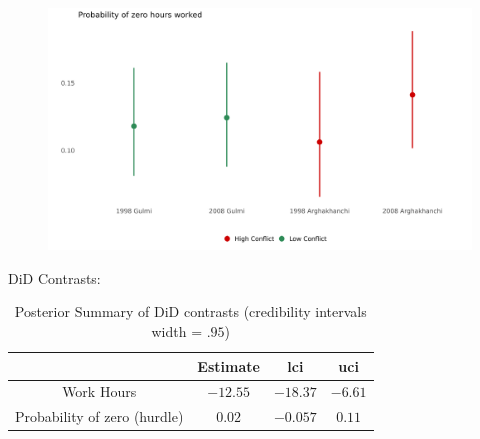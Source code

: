 \documentclass[12pt,a4paper]{article}
\providecommand{\tabularnewline}{\\}
\begin{document}
\begin{figure}[H]
	\centering
	\includegraphics[width=1\textwidth]{../Analysis files/coefplot_map_hu.jpg}
	\caption{}
	\label{fig:coefplot_map_hu}
\end{figure}

DiD Contrasts:

\begin{table}[H]
	\caption{Posterior Summary of DiD contrasts (credibility intervals width = $.95$)}
	
	\renewcommand{\arraystretch}{1.2}
	\vspace{1em}
	\centering{}%
	\begin{tabular}{c|c|c|c|}
		& Estimate & lci& uci \tabularnewline
		\hline 
		Work Hours & $-12.55$ & $-18.37$ & $-6.61$ \tabularnewline
		Probability of zero (hurdle) & $0.02$ & $-0.057$ & $0.11$ \tabularnewline
		\hline 
	\end{tabular}
\end{table}


\printbibliography
	
\end{document}
